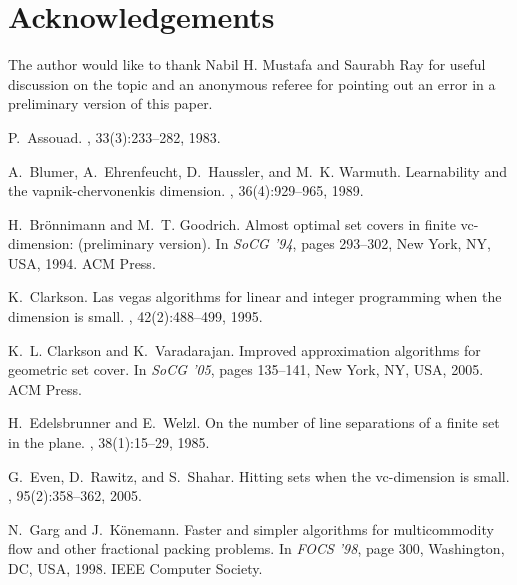 \documentclass{stacs_proc}
\begin{document}
\vskip-0.3cm
\section*{Acknowledgements}
The author would like to thank Nabil H. Mustafa and Saurabh Ray for
useful discussion on the topic and an anonymous referee for pointing
out an error in a preliminary version of this paper. 














\vskip-0.3cm
\begin{thebibliography}{10}

P.~Assouad.
, 33(3):233--282, 1983.

A.~Blumer, A.~Ehrenfeucht, D.~Haussler, and M.~K. Warmuth.
\newblock Learnability and the vapnik-chervonenkis dimension.
, 36(4):929--965, 1989.

H.~Br\"{o}nnimann and M.~T. Goodrich.
\newblock Almost optimal set covers in finite vc-dimension: (preliminary
  version).
\newblock In {\em SoCG '94}, pages 293--302, New York, NY, USA, 1994. ACM
  Press.

K.~Clarkson.
\newblock Las vegas algorithms for linear and integer programming when the
  dimension is small.
, 42(2):488--499, 1995.

K.~L. Clarkson and K.~Varadarajan.
\newblock Improved approximation algorithms for geometric set cover.
\newblock In {\em SoCG '05}, pages 135--141, New York, NY, USA, 2005. ACM
  Press.

H.~Edelsbrunner and E.~Welzl.
\newblock On the number of line separations of a finite set in the plane.
, 38(1):15--29, 1985.

G.~Even, D.~Rawitz, and S.~Shahar.
\newblock Hitting sets when the vc-dimension is small.
, 95(2):358--362, 2005.

N.~Garg and J.~K\"{o}nemann.
\newblock Faster and simpler algorithms for multicommodity flow and other
  fractional packing problems.
\newblock In {\em FOCS '98}, page 300, Washington, DC, USA, 1998. IEEE Computer
  Society.


\end{thebibliography}
\end{document}
